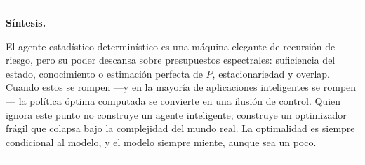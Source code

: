 \documentclass[12pt, a4paper]{article}
\theoremstyle{plain}
\theoremstyle{definition}
\begin{document}

\bigskip
\noindent\rule{\textwidth}{0.4pt}

\smallskip
\noindent\textbf{Síntesis.}

{\sloppy
El agente estadístico determinístico es una máquina elegante de
recursión de riesgo, pero su poder descansa sobre presupuestos
espectrales: suficiencia del estado, conocimiento o estimación perfecta
de $P$, estacionariedad y overlap. Cuando estos se rompen ---y en la
mayoría de aplicaciones inteligentes se rompen--- la política óptima
computada se convierte en una ilusión de control. Quien ignora este
punto no construye un agente inteligente; construye un optimizador
frágil que colapsa bajo la complejidad del mundo real. La optimalidad es
siempre condicional al modelo, y el modelo siempre miente, aunque sea
un poco.
}

\noindent\rule{\textwidth}{0.4pt}
\end{document}
